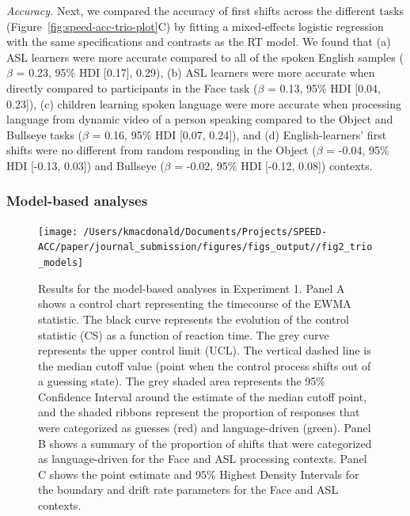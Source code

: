 \documentclass[english,floatsintext,man]{apa6}
\begin{document}
\emph{Accuracy.} Next, we compared the accuracy of first shifts across
the different tasks (Figure~\ref{fig:speed-acc-trio-plot}C) by fitting a
mixed-effects logistic regression with the same specifications and
contrasts as the RT model. We found that (a) ASL learners were more
accurate compared to all of the spoken English samples (\(\beta\) =
0.23, 95\% HDI {[}0.17{]}, 0.29), (b) ASL learners were more accurate
when directly compared to participants in the Face task (\(\beta\) =
0.13, 95\% HDI {[}0.04, 0.23{]}), (c) children learning spoken language
were more accurate when processing language from dynamic video of a
person speaking compared to the Object and Bullseye tasks (\(\beta\) =
0.16, 95\% HDI {[}0.07, 0.24{]}), and (d) English-learners' first shifts
were no different from random responding in the Object (\(\beta\) =
-0.04, 95\% HDI {[}-0.13, 0.03{]}) and Bullseye (\(\beta\) = -0.02, 95\%
HDI {[}-0.12, 0.08{]}) contexts.

\hypertarget{model-based-analyses}{%
\subsubsection{Model-based analyses}\label{model-based-analyses}}

\begin{figure}[!t]

{\centering \texttt{[image: /Users/kmacdonald/Documents/Projects/SPEED-ACC/paper/journal\_submission/figures/figs\_output//fig2\_trio\_models]} 

}

\caption{Results for the model-based analyses in Experiment 1. Panel A shows a control chart representing the timecourse of the EWMA statistic. The black curve represents the evolution of the control statistic (CS) as a function of reaction time. The grey curve represents the upper control limit (UCL). The vertical dashed line is the median cutoff value (point when the control process shifts out of a guessing state). The grey shaded area represents the 95\% Confidence Interval around the estimate of the median cutoff point, and the shaded ribbons represent the proportion of responses that were categorized as guesses (red) and language-driven (green). Panel B shows a summary of the proportion of shifts that were categorized as language-driven for the Face and ASL processing contexts. Panel C shows the point estimate and 95\% Highest Density Intervals for the boundary and drift rate parameters for the Face and ASL contexts.}\label{fig:trio-model-plot}
\end{figure}
\end{document}
